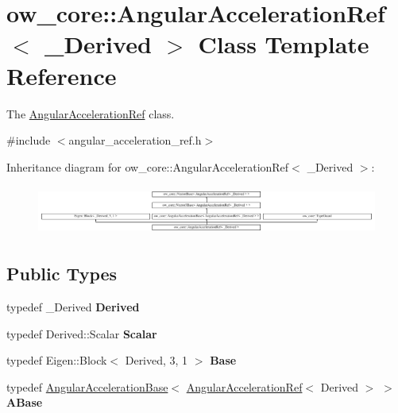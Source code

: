 \hypertarget{classow__core_1_1AngularAccelerationRef}{}\section{ow\+\_\+core\+:\+:Angular\+Acceleration\+Ref$<$ \+\_\+\+Derived $>$ Class Template Reference}
\label{classow__core_1_1AngularAccelerationRef}


The \hyperlink{classow__core_1_1AngularAccelerationRef}{Angular\+Acceleration\+Ref} class.  




{\ttfamily \#include $<$angular\+\_\+acceleration\+\_\+ref.\+h$>$}

Inheritance diagram for ow\+\_\+core\+:\+:Angular\+Acceleration\+Ref$<$ \+\_\+\+Derived $>$\+:\begin{figure}[H]
\begin{center}
\leavevmode
\includegraphics[height=1.637427cm]{d6/d6c/classow__core_1_1AngularAccelerationRef}
\end{center}
\end{figure}
\subsection*{Public Types}
\begin{DoxyCompactItemize}
\item 
typedef \+\_\+\+Derived {\bfseries Derived}\hypertarget{classow__core_1_1AngularAccelerationRef_afa1a59d3353ae26c4b217c5910c3b774}{}\label{classow__core_1_1AngularAccelerationRef_afa1a59d3353ae26c4b217c5910c3b774}

\item 
typedef Derived\+::\+Scalar {\bfseries Scalar}\hypertarget{classow__core_1_1AngularAccelerationRef_a9d83e35a2cd6840d118b7de20ce80703}{}\label{classow__core_1_1AngularAccelerationRef_a9d83e35a2cd6840d118b7de20ce80703}

\item 
typedef Eigen\+::\+Block$<$ Derived, 3, 1 $>$ {\bfseries Base}\hypertarget{classow__core_1_1AngularAccelerationRef_a0c502478421b2ee63b6ce3b5a6bc93af}{}\label{classow__core_1_1AngularAccelerationRef_a0c502478421b2ee63b6ce3b5a6bc93af}

\item 
typedef \hyperlink{classow__core_1_1AngularAccelerationBase}{Angular\+Acceleration\+Base}$<$ \hyperlink{classow__core_1_1AngularAccelerationRef}{Angular\+Acceleration\+Ref}$<$ Derived $>$ $>$ {\bfseries A\+Base}\hypertarget{classow__core_1_1AngularAccelerationRef_a910ba286d226dc6d0203751c4af1a70a}{}\label{classow__core_1_1AngularAccelerationRef_a910ba286d226dc6d0203751c4af1a70a}

\end{DoxyCompactItemize}
